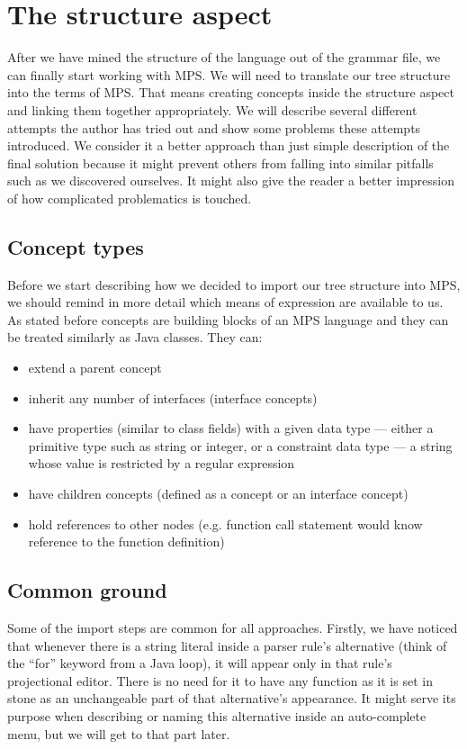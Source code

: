 \section{The structure aspect}

After we have mined the structure of the language out of the grammar file, we can finally start working with MPS. We will need to translate our tree structure into the terms of MPS. That means creating concepts inside the structure aspect and linking them together appropriately. We will describe several different attempts the author has tried out and show some problems these attempts introduced. We consider it a better approach than just simple description of the final solution because it might prevent others from falling into similar pitfalls such as we discovered ourselves. It might also give the reader a better impression of how complicated problematics is touched. 

\subsection{Concept types}

Before we start describing how we decided to import our tree structure into MPS, we should remind in more detail which means of expression are available to us. As stated before concepts are building blocks of an MPS language and they can be treated similarly as Java classes. They can:

\begin{itemize}
	\item extend a parent concept
	\item inherit any number of interfaces (interface concepts)
	\item have properties (similar to class fields) with a given data type --- either a primitive type such as string or integer, or a constraint data type --- a string whose value is restricted by a regular expression
	\item have children concepts (defined as a concept or an interface concept)
	\item hold references to other nodes (e.g. function call statement would know reference to the function definition)
\end{itemize}

\subsection{Common ground}

Some of the import steps are common for all approaches. Firstly, we have noticed that whenever there is a string literal inside a parser rule's alternative (think of the “for” keyword from a Java loop), it will appear only in that rule's projectional editor. There is no need for it to have any function as it is set in stone as an unchangeable part of that alternative's appearance. It might serve its purpose when describing or naming this alternative inside an auto-complete menu, but we will get to that part later.
\\

